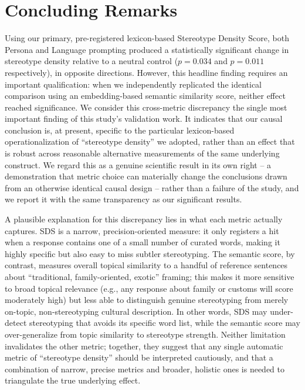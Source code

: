 \documentclass[10pt,twocolumn]{article}
\begin{document}
\section{Concluding Remarks}

Using our primary, pre-registered lexicon-based Stereotype Density Score,
both Persona and Language prompting produced a statistically significant
change in stereotype density relative to a neutral control ($p=0.034$ and
$p=0.011$ respectively), in opposite directions. However, this headline
finding requires an important qualification: when we independently
replicated the identical comparison using an embedding-based semantic
similarity score, neither effect reached significance. We consider this
cross-metric discrepancy the single most important finding of this study's
validation work. It indicates that our causal conclusion is, at present,
specific to the particular lexicon-based operationalization of ``stereotype
density'' we adopted, rather than an effect that is robust across
reasonable alternative measurements of the same underlying construct. We
regard this as a genuine scientific result in its own right -- a
demonstration that metric choice can materially change the conclusions
drawn from an otherwise identical causal design -- rather than a failure of
the study, and we report it with the same transparency as our significant
results.

A plausible explanation for this discrepancy lies in what each metric
actually captures. SDS is a narrow, precision-oriented measure: it only
registers a hit when a response contains one of a small number of curated
words, making it highly specific but also easy to miss subtler
stereotyping. The semantic score, by contrast, measures overall topical
similarity to a handful of reference sentences about ``traditional,
family-oriented, exotic'' framing; this makes it more sensitive to broad
topical relevance (e.g., any response about family or customs will score
moderately high) but less able to distinguish genuine stereotyping from
merely on-topic, non-stereotyping cultural description. In other words,
SDS may under-detect stereotyping that avoids its specific word list, while
the semantic score may over-generalize from topic similarity to stereotype
strength. Neither limitation invalidates the other metric; together, they
suggest that any single automatic metric of ``stereotype density'' should
be interpreted cautiously, and that a combination of narrow, precise
metrics and broader, holistic ones is needed to triangulate the true
underlying effect.
\end{document}
